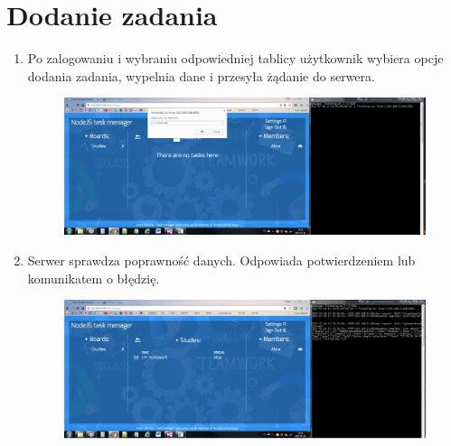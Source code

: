 \documentclass[12pt]{report}
\begin{document}
\section{Dodanie zadania}
\begin{enumerate}
\item Po zalogowaniu i wybraniu odpowiedniej tablicy użytkownik wybiera opcje dodania zadania, wypelnia dane i przesyła żądanie do serwera.
\begin{figure}[!hb]
\centering
\includegraphics[width=\textwidth,height=\textheight,keepaspectratio]{A1.png}
\end{figure}
\item Serwer sprawdza poprawność danych. Odpowiada potwierdzeniem lub komunikatem o błędzię.
\begin{figure}[!hb]
\centering
\includegraphics[width=\textwidth,height=\textheight,keepaspectratio]{A2.png}
\end{figure}
\end{enumerate}
\end{document}
